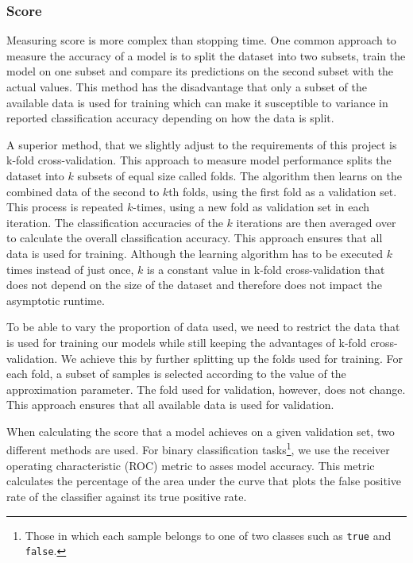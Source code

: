 \documentclass[a4paper,12pt,twoside,openright]{report}
\begin{document}
\subsubsection{Score}

Measuring score is more complex than stopping time. One common approach to measure the accuracy of a model is to split the dataset into two subsets, train the model on one subset and compare its predictions on the second subset with the actual values. This method has the disadvantage that only a subset of the available data is used for training which can make it susceptible to variance in reported classification accuracy depending on how the data is split.

A superior method, that we slightly adjust to the requirements of this project is k-fold cross-validation. This approach to measure model performance splits the dataset into $k$ subsets of equal size called folds. The algorithm then learns on the combined data of the second to $k$th folds, using the first fold as a validation set. This process is repeated $k$-times, using a new fold as validation set in each iteration. The classification accuracies of the $k$ iterations are then averaged over to calculate the overall classification accuracy. This approach ensures that all data is used for training. Although the learning algorithm has to be executed $k$ times instead of just once, $k$ is a constant value in k-fold cross-validation that does not depend on the size of the dataset and therefore does not impact the asymptotic runtime.

To be able to vary the proportion of data used, we need to restrict the data that is used for training our models while still keeping the advantages of k-fold cross-validation. We achieve this by further splitting up the folds used for training. For each fold, a subset of samples is selected according to the value of the approximation parameter. The fold used for validation, however, does not change. This approach ensures that all available data is used for validation.

When calculating the score that a model achieves on a given validation set, two different methods are used. For binary classification tasks\footnote{Those in which each sample belongs to one of two classes such as \texttt{true} and \texttt{false}.}, we use the receiver operating characteristic (ROC) metric to asses model accuracy. This metric calculates the percentage of the area under the curve that plots the false positive rate of the classifier against its true positive rate. 
\end{document}
